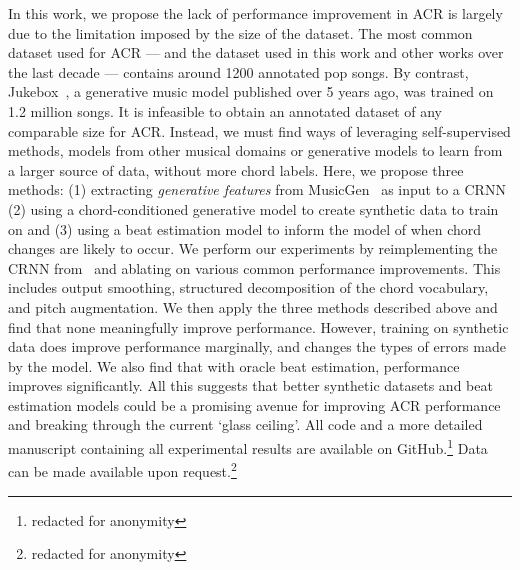 In this work, we propose the lack of performance improvement in ACR is largely due to the limitation imposed by the size of the dataset. The most common dataset used for ACR — and the dataset used in this work and other works over the last decade — contains around 1200 annotated pop songs. By contrast, Jukebox~\cite{Jukebox}, a generative music model published over 5 years ago, was trained on 1.2 million songs. It is infeasible to obtain an annotated dataset of any comparable size for ACR. Instead, we must find ways of leveraging self-supervised methods, models from other musical domains or generative models to learn from a larger source of data, without more chord labels. Here, we propose three methods: (1) extracting \emph{generative features} from MusicGen~\cite{MusicGen} as input to a CRNN (2) using a chord-conditioned generative model to create synthetic data to train on and (3) using a beat estimation model to inform the model of when chord changes are likely to occur. We perform our experiments by reimplementing the CRNN from~\cite{StructuredTraining} and ablating on various common performance improvements. This includes output smoothing, structured decomposition of the chord vocabulary, and pitch augmentation. We then apply the three methods described above and find that none meaningfully improve performance. However, training on synthetic data does improve performance marginally, and changes the types of errors made by the model. We also find that with oracle beat estimation, performance improves significantly. All this suggests that better synthetic datasets and beat estimation models could be a promising avenue for improving ACR performance and breaking through the current `glass ceiling'. All code and a more detailed manuscript containing all experimental results are available on GitHub.\footnote{redacted for anonymity} Data can be made available upon request.\footnote{redacted for anonymity}

